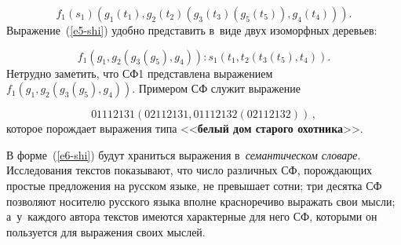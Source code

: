 \begin{multicols}{2}
\vspace*{3pt} 

\noindent
     \begin{equation}
               f_1(s_1)\left(g_1(t_1), g_2(t_2)\left(g_3(t_3)(g_5(t_5)), 
g_4(t_4)\right)\right).
               \label{e5-shi}
               \end{equation}
Выражение~(\ref{e5-shi}) удобно представить в~виде двух изоморфных 
деревьев:

\vspace*{3pt}

\noindent
\begin{equation}
f_1
\left(g_1, g_2\left(g_3(g_5), g_4\right)\right):
s_1\left(t_1, t_2\left(t_3(t_5), 
t_4\right)\right).
               \label{e6-shi}
               \end{equation}
Нетрудно заметить, что СФ1 представлена выражением $f_1(g_1, g_2(g_3(g_5), 
g_4))$. Примером СФ служит выражение 

\vspace*{3pt}

\noindent
\begin{equation*}
               01112131(02112131, 01112132(02112132))\,,
              \end{equation*}
которое порождает выражения типа <<\textbf{белый дом старого 
охотника}>>.
     
     В форме~(\ref{e6-shi}) будут храниться выражения 
в~\textit{семантическом словаре}. Исследования текстов показывают, что 
число различных СФ, порождающих простые предложения на русском языке, 
не превышает сотни; три десятка СФ позволяют носителю русского языка 
вполне красноречиво выражать свои мысли; а~у~каждого автора текстов 
имеются характерные для него СФ, которыми он пользуется для выражения 
своих мыслей.


\end{multicols}
